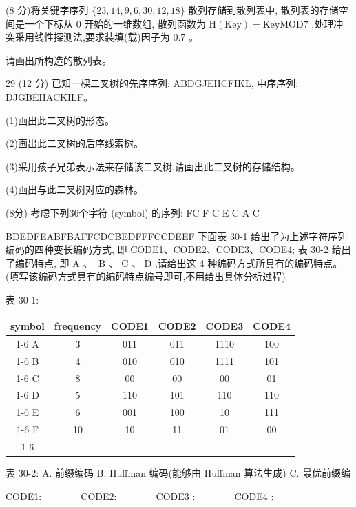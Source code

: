 (8 分)将关键字序列 \(\{ {23},{14},9,6,{30},{12},{18}\}\) 散列存储到散列表中, 散列表的存储空间是一个下标从 0 开始的一维数组, 散列函数为 \(\mathrm{H}\left( \mathrm{{Key}}\right)  = \mathrm{{Key}}\mathrm{{MOD}}7\) ,处理冲突采用线性探测法,要求装填(载)因子为 0.7 。

请画出所构造的散列表。
\vspace{10em}

29 (12 分) 已知一棵二叉树的先序序列: ABDGJEHCFIKL, 中序序列: DJGBEHACKILF。

(1)画出此二叉树的形态。

(2)画出此二叉树的后序线索树。

(3)采用孩子兄弟表示法来存储该二叉树,请画出此二叉树的存储结构。

(4)画出与此二叉树对应的森林。
\vspace{10em}

 (8分) 考虑下列36个字符 (symbol) 的序列: FC F C E C A C

BDEDFEABFBAFFCDCBEDFFFCCDEEF 下面表 30-1 给出了为上述字符序列编码的四种变长编码方式, 即 CODE1、CODE2、CODE3、CODE4; 表 30-2 给出了编码特点, 即 \(\mathrm{A}\text{ 、 }\mathrm{\;B}\text{ 、 }\mathrm{C}\text{ 、 }\mathrm{D}\) ,请给出这 4 种编码方式所具有的编码特点。(填写该编码方式具有的编码特点编号即可,不用给出具体分析过程) 

表 30-1:

\begin{center}
\begin{tabular}{|c|c|c|c|c|c|}
\hline
symbol & frequency & CODE1 & CODE2 & CODE3 & CODE4 \\
\cline{1-6}
A & 3 & 011 & 011 & 1110 & 100 \\
\cline{1-6}
B & 4 & 010 & 010 & 1111 & 101 \\
\cline{1-6}
C & 8 & 00 & 00 & 00 & 01 \\
\cline{1-6}
D & 5 & 110 & 101 & 110 & 110 \\
\cline{1-6}
E & 6 & 001 & 100 & 10 & 111 \\
\cline{1-6}
F & 10 & 10 & 11 & 01 & 00 \\
\cline{1-6}
\hline
\end{tabular}
\end{center}

表 30-2: A. 前缀编码 B. Huffman 编码(能够由 Huffman 算法生成) C. 最优前缀编

CODE1:\_\_\_\_\_ CODE2:\_\_\_\_\_ CODE3 :\_\_\_\_\_ CODE4 :\_\_\_\_\_
\vspace{10em}

